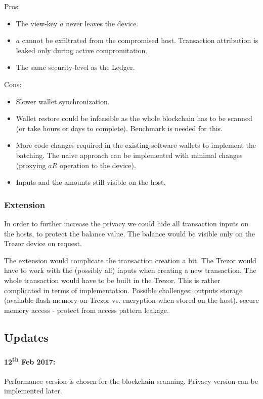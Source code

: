 \documentclass[]{article}
\begin{document}
\noindent Pros:
\begin{itemize}
	\item The view-key $a$ never leaves the device.
	\item $a$ cannot be exfiltrated from the compromised host. Transaction attribution is leaked only during active compromitation.
	\item The same security-level as the Ledger.
\end{itemize}

\noindent Cons:
\begin{itemize}
	\item Slower wallet synchronization.
	\item Wallet restore could be infeasible as the whole blockchain has to be scanned (or take hours or days to complete). Benchmark is needed for this.
	\item More code changes required in the existing software wallets to implement the batching. The naive approach can be implemented with minimal changes (proxying $aR$ operation to the device).
	\item Inputs and the amounts still visible on the host.
\end{itemize}

\subsubsection{Extension} In order to further increase the privacy we could hide all transaction inputs on the hosts, to protect the balance value. The balance would be visible only on the Trezor device on request.

The extension would complicate the transaction creation a bit. The Trezor would have to work with the (possibly all) inputs when creating a new transaction. The whole transaction would have to be built in the Trezor. This is rather complicated in terms of implementation. Possible challenges: outputs storage (available flash memory on Trezor vs. encryption when stored on the host), secure memory access - protect from access pattern leakage.

\subsection{Updates}

\paragraph{12\textsuperscript{th} Feb 2017:} Performance version is chosen for the blockchain scanning. Privacy version can be implemented later.
\end{document}
